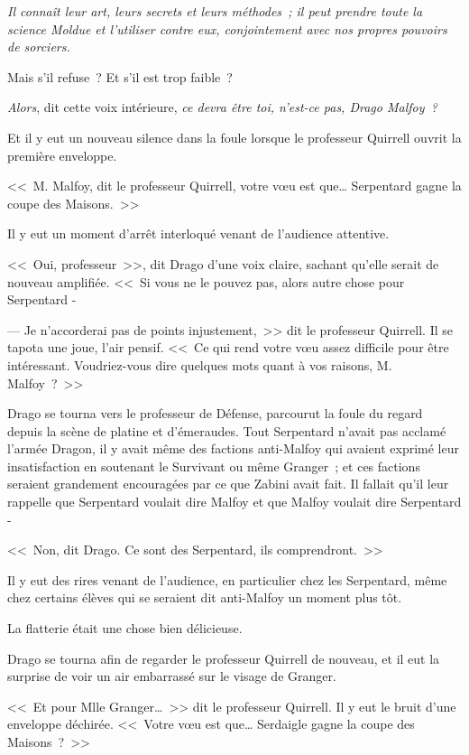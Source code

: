 \emph{Il connaît leur art, leurs secrets et leurs méthodes~; il peut prendre toute la science Moldue et l'utiliser contre eux, conjointement avec nos propres pouvoirs de sorciers.}

Mais s'il refuse~? Et s'il est trop faible~?

\emph{Alors}, dit cette voix intérieure, \emph{ce devra être toi, n'est-ce pas, Drago Malfoy~?}

Et il y eut un nouveau silence dans la foule lorsque le professeur Quirrell ouvrit la première enveloppe.

<<~M. Malfoy, dit le professeur Quirrell, votre vœu est que… Serpentard gagne la coupe des Maisons.~>>

Il y eut un moment d'arrêt interloqué venant de l'audience attentive.

<<~Oui, professeur~>>, dit Drago d'une voix claire, sachant qu'elle serait de nouveau amplifiée. <<~Si vous ne le pouvez pas, alors autre chose pour Serpentard -

--- Je n'accorderai pas de points injustement,~>> dit le professeur Quirrell. Il se tapota une joue, l'air pensif. <<~Ce qui rend votre vœu assez difficile pour être intéressant. Voudriez-vous dire quelques mots quant à vos raisons, M. Malfoy~?~>>

Drago se tourna vers le professeur de Défense, parcourut la foule du regard depuis la scène de platine et d'émeraudes. Tout Serpentard n'avait pas acclamé l'armée Dragon, il y avait même des factions anti-Malfoy qui avaient exprimé leur insatisfaction en soutenant le Survivant ou même Granger~; et ces factions seraient grandement encouragées par ce que Zabini avait fait. Il fallait qu'il leur rappelle que Serpentard voulait dire Malfoy et que Malfoy voulait dire Serpentard -

<<~Non, dit Drago. Ce sont des Serpentard, ils comprendront.~>>

Il y eut des rires venant de l'audience, en particulier chez les Serpentard, même chez certains élèves qui se seraient dit anti-Malfoy un moment plus tôt.

La flatterie était une chose bien délicieuse.

Drago se tourna afin de regarder le professeur Quirrell de nouveau, et il eut la surprise de voir un air embarrassé sur le visage de Granger.

<<~Et pour Mlle Granger…~>> dit le professeur Quirrell. Il y eut le bruit d'une enveloppe déchirée. <<~Votre vœu est que… Serdaigle gagne la coupe des Maisons~?~>>

